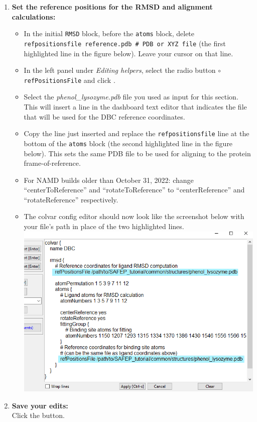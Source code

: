 \documentclass[9pt,tutorial,pubversion]{Styling/livecoms}
\newcommand{\filepath}[1]{\textit{#1}}
\newcommand{\button}[1]{\inlineBox[gray]{\texttt{#1}}}
\newcommand{\menu}[1]{\textit{#1}}
\newcommand{\option}[1]{\texttt{#1}}
\newcommand{\textInput}[1]{\texttt{#1}}
\begin{document}
\begin{enumerate}
\begin{enumerate}[label=\alph*., ref=\theenumi.\alph*]
             \item \textbf{Set the reference positions for the RMSD and alignment calculations:} 
             \begin{itemize}
                 \item In the initial \textInput{RMSD} block, before the \textInput{atoms} block, delete \textInput{refpositionsfile reference.pdb \# PDB or XYZ file} (the first highlighted line in the figure below). Leave your cursor on that line.
                \item In the left panel under \menu{Editing helpers}, select the radio button \option{$\circ$  refPositionsFile} and click \button{Pick File}. 
                \item Select the \filepath{phenol\_lysozyme.pdb} file you used as input for this section. This will insert a line in the dashboard text editor that indicates the file that will be used for the DBC reference coordinates.
                \item Copy the line just inserted and replace the \textInput{refpositionsfile} line at the bottom of the \textInput{atoms} block (the second highlighted line in the figure below). This sets the same PDB file to be used for aligning to the protein frame-of-reference.
                \item For NAMD builds older than October 31, 2022: change ``centerToReference'' and ``rotateToReference'' to ``centerReference'' and ``rotateReference'' respectively.
                \item The colvar config editor should now look like the screenshot below with your file's path in place of the two highlighted lines.\\
                \includegraphics[width=0.75\linewidth ]{CV_dashboard_StepA.png} \label{fig:refposfiles}
            \end{itemize}
            \item \textbf{Save your edits:}\\
            Click the \button{Apply [Ctrl-s]} button.
        \end{enumerate}
        

\end{enumerate}
\end{document}
